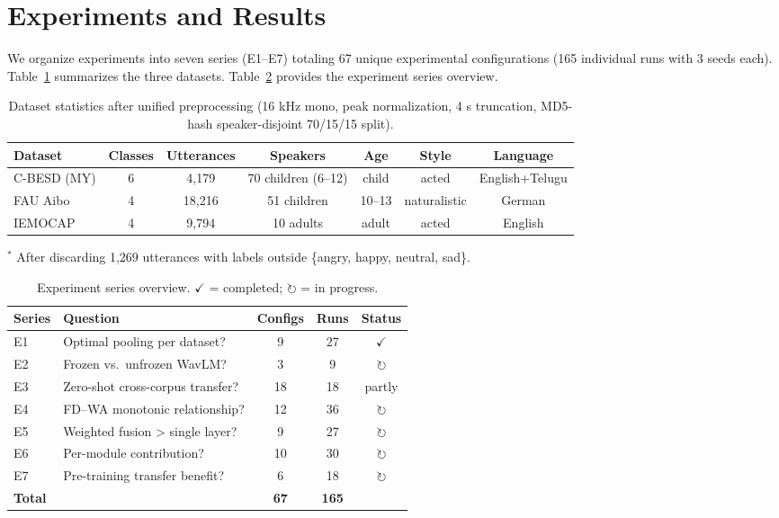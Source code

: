 \documentclass[11pt,a4paper]{article}
\begin{document}
\section{Experiments and Results}
\label{sec:experiments_results}

We organize experiments into seven series (E1--E7) totaling 67 unique
experimental configurations (165 individual runs with 3 seeds each).
Table~\ref{tab:datasets} summarizes the three datasets.
Table~\ref{tab:exp_overview} provides the experiment series overview.

\begin{table}[t]
\centering
\caption{Dataset statistics after unified preprocessing (16 kHz mono, peak normalization, 4 s truncation, MD5-hash speaker-disjoint 70/15/15 split).}
\label{tab:datasets}
\begin{tabular}{lcccccc}
\toprule
\textbf{Dataset} & \textbf{Classes} & \textbf{Utterances} & \textbf{Speakers} & \textbf{Age} & \textbf{Style} & \textbf{Language} \\
\midrule
C-BESD (MY) & 6 & 4,179 & 70 children (6--12) & child & acted & English+Telugu \\
FAU Aibo    & 4 & 18,216 & 51 children & 10--13 & naturalistic & German \\
IEMOCAP     & 4 & 9,794 & 10 adults & adult & acted & English \\
\bottomrule
\end{tabular}
\vspace{4pt}
\footnotesize{$^*$ After discarding 1,269 utterances with labels outside \{angry, happy, neutral, sad\}.}
\end{table}

\begin{table}[t]
\centering
\caption{Experiment series overview. $\checkmark$ = completed; $\circlearrowright$ = in progress.}
\label{tab:exp_overview}
\begin{tabular}{llccc}
\toprule
\textbf{Series} & \textbf{Question} & \textbf{Configs} & \textbf{Runs} & \textbf{Status} \\
\midrule
E1 & Optimal pooling per dataset? & 9 & 27 & $\checkmark$ \\
E2 & Frozen vs.\ unfrozen WavLM? & 3 & 9 & $\circlearrowright$ \\
E3 & Zero-shot cross-corpus transfer? & 18 & 18 & partly \\
E4 & FD--WA monotonic relationship? & 12 & 36 & $\circlearrowright$ \\
E5 & Weighted fusion > single layer? & 9 & 27 & $\circlearrowright$ \\
E6 & Per-module contribution? & 10 & 30 & $\circlearrowright$ \\
E7 & Pre-training transfer benefit? & 6 & 18 & $\circlearrowright$ \\
\midrule
\textbf{Total} & & \textbf{67} & \textbf{165} & \\
\bottomrule
\end{tabular}
\end{table}
\end{document}

